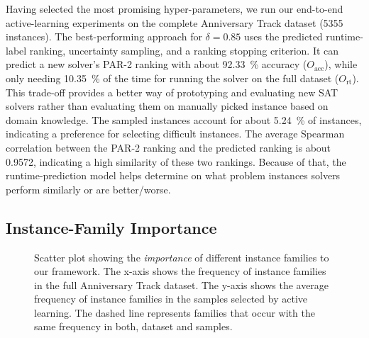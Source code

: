 \documentclass[runningheads]{llncs}
\begin{document}
Having selected the most promising hyper-parame\-ters, we run our end-to-end active-learning experiments on the complete Anniversary Track dataset (5355 instances).
The best-performing approach for $\delta = 0.85$ uses the predicted runtime-label ranking, uncertainty sampling, and a ranking stopping criterion.
It can predict a new solver's PAR-2 ranking with about \SI{92.33}{\%} accuracy ($O_{\operatorname{acc}}$), while only needing \SI{10.35}{\%} of the time for running the solver on the full dataset ($O_{\operatorname{rt}}$).
This trade-off provides a better way of prototyping and evaluating new SAT solvers rather than evaluating them on manually picked instance based on domain knowledge.
The sampled instances account for about \SI{5.24}{\%} of instances, indicating a preference for selecting difficult instances.
The average Spearman correlation between the PAR-2 ranking and the predicted ranking is about \SI{0.9572}{}, indicating a high similarity of these two rankings.
Because of that, the runtime-prediction model helps determine on what problem instances solvers perform similarly or are better/worse.

\subsection{Instance-Family Importance}

\begin{figure}[tb!]
	\centering
	\caption{
		Scatter plot showing the \emph{importance} of different instance families to our framework.
		The x-axis shows the frequency of instance families in the full Anniversary Track dataset.
		The y-axis shows the average frequency of instance families in the samples selected by active learning.
		The dashed line represents families that occur with the same frequency in both, dataset and samples.
	}
	\label{fig:annifinalfamilies}
\end{figure}
\end{document}
